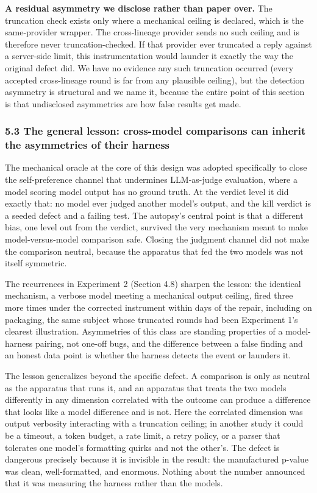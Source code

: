 \documentclass[
  11pt,
]{article}
\begin{document}
\textbf{A residual asymmetry we disclose rather than paper over.} The
truncation check exists only where a mechanical ceiling is declared,
which is the same-provider wrapper. The cross-lineage provider sends no
such ceiling and is therefore never truncation-checked. If that provider
ever truncated a reply against a server-side limit, this instrumentation
would launder it exactly the way the original defect did. We have no
evidence any such truncation occurred (every accepted cross-lineage
round is far from any plausible ceiling), but the detection asymmetry is
structural and we name it, because the entire point of this section is
that undisclosed asymmetries are how false results get made.

\subsubsection{5.3 The general lesson: cross-model comparisons can
inherit the asymmetries of their
harness}\label{the-general-lesson-cross-model-comparisons-can-inherit-the-asymmetries-of-their-harness}

The mechanical oracle at the core of this design was adopted
specifically to close the self-preference channel that undermines
LLM-as-judge evaluation, where a model scoring model output has no
ground truth. At the verdict level it did exactly that: no model ever
judged another model's output, and the kill verdict is a seeded defect
and a failing test. The autopsy's central point is that a different
bias, one level out from the verdict, survived the very mechanism meant
to make model-versus-model comparison safe. Closing the judgment channel
did not make the comparison neutral, because the apparatus that fed the
two models was not itself symmetric.

The recurrences in Experiment 2 (Section 4.8) sharpen the lesson: the
identical mechanism, a verbose model meeting a mechanical output
ceiling, fired three more times under the corrected instrument within
days of the repair, including on packaging, the same subject whose
truncated rounds had been Experiment 1's clearest illustration.
Asymmetries of this class are standing properties of a model-harness
pairing, not one-off bugs, and the difference between a false finding
and an honest data point is whether the harness detects the event or
launders it.

The lesson generalizes beyond the specific defect. A comparison is only
as neutral as the apparatus that runs it, and an apparatus that treats
the two models differently in any dimension correlated with the outcome
can produce a difference that looks like a model difference and is not.
Here the correlated dimension was output verbosity interacting with a
truncation ceiling; in another study it could be a timeout, a token
budget, a rate limit, a retry policy, or a parser that tolerates one
model's formatting quirks and not the other's. The defect is dangerous
precisely because it is invisible in the result: the manufactured
p-value was clean, well-formatted, and enormous. Nothing about the
number announced that it was measuring the harness rather than the
models.
\end{document}

